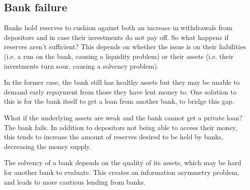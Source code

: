 
\subsection{Bank failure}

Banks hold reserves to cushion against both an increase in withdrawals from depositors and in case their investments do not pay off. So what happens if reserves aren’t sufficient? This depends on whether the issue is on their liabilities (i.e. a run on the bank, causing a liquidity problem) or their assets (i.e. their investments turn sour, causing a solvency problem).

In the former case, the bank still has healthy assets but they may be unable to demand early repayment from those they have lent money to. One solution to this is for the bank itself to get a loan from another bank, to bridge this gap.

What if the underlying assets are weak and the bank cannot get a private loan? The bank fails. In addition to depositors not being able to access their money, this tends to increase the amount of reserves desired to be held by banks, decreasing the money supply.

The solvency of a bank depends on the quality of its assets, which may be hard for another bank to evaluate. This creates an information asymmetry problem, and leads to more cautious lending from banks.

